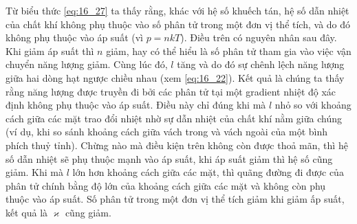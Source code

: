 Từ biểu thức \eqref{eq:16_27} ta thấy rằng, khác với hệ số khuếch tán, hệ số dẫn nhiệt của chất khí không phụ thuộc vào số phân tử trong một đơn vị thể tích, và do đó không phụ thuộc vào áp suất (vì $p=nkT$). Điều trên có nguyên nhân sau đây. Khi giảm áp suất thì $n$ giảm, hay có thể hiểu là số phân tử tham gia vào việc vận chuyển năng lượng giảm. Cùng lúc đó, $l$ tăng và do đó sự chênh lệch năng lượng giữa hai dòng hạt ngược chiều nhau (xem \eqref{eq:16_22}). Kết quả là chúng ta thấy rằng năng lượng được truyền đi bởi các phân tử tại một gradient nhiệt độ xác định không phụ thuộc vào áp suất. Điều này chỉ đúng khi mà $l$ nhỏ so với khoảng cách giữa các mặt trao đổi nhiệt nhờ sự dẫn nhiệt của chất khí nằm giữa chúng (ví dụ, khi so sánh khoảng cách giữa vách trong và vách ngoài của một bình phích thuỷ tỉnh). Chừng nào mà điều kiện trên không còn được thoả mãn, thì hệ số dẫn nhiệt sẽ phụ thuộc mạnh vào áp suất, khi áp suất giảm thì hệ số cũng giảm. Khi mà $l$ lớn hơn khoảng cách giữa các mặt, thì quãng đường đi được của phân tử chính bằng độ lớn của khoảng cách giữa các mặt và không còn phụ thuộc vào áp suất. Số phân tử trong một đơn vị thể tích giảm khi giảm ấp suất, kết quả là $\varkappa$ cũng giảm. 


